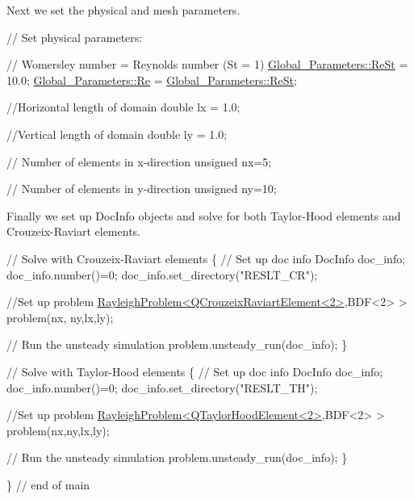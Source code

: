 Next we set the physical and mesh parameters.


\begin{DoxyCodeInclude}


 \textcolor{comment}{// Set physical parameters:}

 \textcolor{comment}{// Womersley number = Reynolds number (St = 1)}
 \hyperlink{namespaceGlobal__Parameters_a7a59a32365e87566069e458dc83bd18a}{Global\_Parameters::ReSt} = 10.0;
 \hyperlink{namespaceGlobal__Parameters_a9d72e94a9305c6a310940a6a427ebe06}{Global\_Parameters::Re} = \hyperlink{namespaceGlobal__Parameters_a7a59a32365e87566069e458dc83bd18a}{Global\_Parameters::ReSt};

 \textcolor{comment}{//Horizontal length of domain}
 \textcolor{keywordtype}{double} lx = 1.0;

 \textcolor{comment}{//Vertical length of domain}
 \textcolor{keywordtype}{double} ly = 1.0;

 \textcolor{comment}{// Number of elements in x-direction}
 \textcolor{keywordtype}{unsigned} nx=5;

 \textcolor{comment}{// Number of elements in y-direction}
 \textcolor{keywordtype}{unsigned} ny=10;

\end{DoxyCodeInclude}


Finally we set up {\ttfamily Doc\+Info} objects and solve for both Taylor-\/\+Hood elements and Crouzeix-\/\+Raviart elements.


\begin{DoxyCodeInclude}

 \textcolor{comment}{// Solve with Crouzeix-Raviart elements}
 \{
  \textcolor{comment}{// Set up doc info}
  DocInfo doc\_info;
  doc\_info.number()=0;
  doc\_info.set\_directory(\textcolor{stringliteral}{"RESLT\_CR"});
  
  \textcolor{comment}{//Set up problem}
  \hyperlink{classRayleighProblem}{RayleighProblem<QCrouzeixRaviartElement<2>},BDF<2> > problem(nx,
      ny,lx,ly);
  
  \textcolor{comment}{// Run the unsteady simulation}
  problem.unsteady\_run(doc\_info);
 \}



 \textcolor{comment}{// Solve with Taylor-Hood elements}
 \{
  \textcolor{comment}{// Set up doc info}
  DocInfo doc\_info;
  doc\_info.number()=0;
  doc\_info.set\_directory(\textcolor{stringliteral}{"RESLT\_TH"});

  \textcolor{comment}{//Set up problem}
  \hyperlink{classRayleighProblem}{RayleighProblem<QTaylorHoodElement<2>},BDF<2> > problem(nx,ny,lx,ly);
  
  \textcolor{comment}{// Run the unsteady simulation}
  problem.unsteady\_run(doc\_info);
 \}

\} \textcolor{comment}{// end of main}

\end{DoxyCodeInclude}




